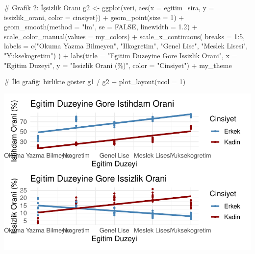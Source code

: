\documentclass[
  11pt,
  a4paper,
  DIV=11,
  numbers=noendperiod]{scrartcl}
\newenvironment{Shaded}{\begin{snugshade}}{\end{snugshade}}
\newcommand{\AttributeTok}[1]{\textcolor[rgb]{0.40,0.45,0.13}{#1}}
\newcommand{\CommentTok}[1]{\textcolor[rgb]{0.37,0.37,0.37}{#1}}
\newcommand{\ConstantTok}[1]{\textcolor[rgb]{0.56,0.35,0.01}{#1}}
\newcommand{\DecValTok}[1]{\textcolor[rgb]{0.68,0.00,0.00}{#1}}
\newcommand{\FloatTok}[1]{\textcolor[rgb]{0.68,0.00,0.00}{#1}}
\newcommand{\FunctionTok}[1]{\textcolor[rgb]{0.28,0.35,0.67}{#1}}
\newcommand{\NormalTok}[1]{\textcolor[rgb]{0.00,0.23,0.31}{#1}}
\newcommand{\OtherTok}[1]{\textcolor[rgb]{0.00,0.23,0.31}{#1}}
\newcommand{\SpecialCharTok}[1]{\textcolor[rgb]{0.37,0.37,0.37}{#1}}
\newcommand{\StringTok}[1]{\textcolor[rgb]{0.13,0.47,0.30}{#1}}
\begin{document}
\begin{Shaded}
\begin{Highlighting}[]
\CommentTok{\# Grafik 2: İşsizlik Oranı}
\NormalTok{g2 }\OtherTok{\textless{}{-}} \FunctionTok{ggplot}\NormalTok{(veri, }\FunctionTok{aes}\NormalTok{(}\AttributeTok{x =}\NormalTok{ egitim\_sira, }\AttributeTok{y =}\NormalTok{ issizlik\_orani, }\AttributeTok{color =}\NormalTok{ cinsiyet)) }\SpecialCharTok{+}
  \FunctionTok{geom\_point}\NormalTok{(}\AttributeTok{size =} \DecValTok{1}\NormalTok{) }\SpecialCharTok{+}
  \FunctionTok{geom\_smooth}\NormalTok{(}\AttributeTok{method =} \StringTok{"lm"}\NormalTok{, }\AttributeTok{se =} \ConstantTok{FALSE}\NormalTok{, }\AttributeTok{linewidth =} \FloatTok{1.2}\NormalTok{) }\SpecialCharTok{+}
  \FunctionTok{scale\_color\_manual}\NormalTok{(}\AttributeTok{values =}\NormalTok{ my\_colors) }\SpecialCharTok{+}
  \FunctionTok{scale\_x\_continuous}\NormalTok{(}
    \AttributeTok{breaks =} \DecValTok{1}\SpecialCharTok{:}\DecValTok{5}\NormalTok{,}
    \AttributeTok{labels =} \FunctionTok{c}\NormalTok{(}\StringTok{"Okuma Yazma Bilmeyen"}\NormalTok{, }\StringTok{"Ilkogretim"}\NormalTok{, }\StringTok{"Genel Lise"}\NormalTok{, }\StringTok{"Meslek Lisesi"}\NormalTok{, }\StringTok{"Yuksekogretim"}\NormalTok{)}
\NormalTok{  ) }\SpecialCharTok{+}
  \FunctionTok{labs}\NormalTok{(}\AttributeTok{title =} \StringTok{"Egitim Duzeyine Gore Issizlik Orani"}\NormalTok{,}
       \AttributeTok{x =} \StringTok{"Egitim Duzeyi"}\NormalTok{, }\AttributeTok{y =} \StringTok{"Issizlik Orani (\%)"}\NormalTok{, }\AttributeTok{color =} \StringTok{"Cinsiyet"}\NormalTok{) }\SpecialCharTok{+}
\NormalTok{  my\_theme}

\CommentTok{\# İki grafiği birlikte göster}
\NormalTok{g1 }\SpecialCharTok{/}\NormalTok{ g2 }\SpecialCharTok{+} \FunctionTok{plot\_layout}\NormalTok{(}\AttributeTok{ncol =} \DecValTok{1}\NormalTok{)}
\end{Highlighting}
\end{Shaded}

\includegraphics{project_files/figure-pdf/unnamed-chunk-8-1.pdf}
\end{document}
